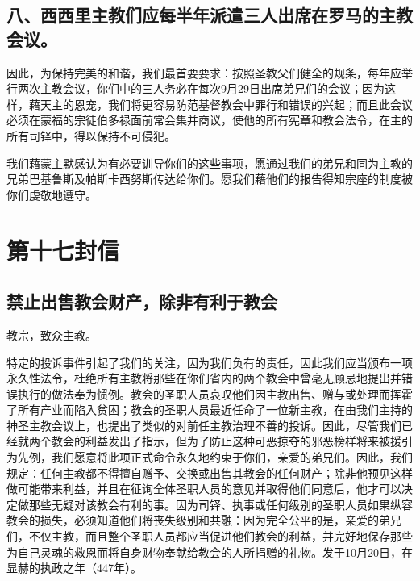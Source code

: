 
\subsection{八、西西里主教们应每半年派遣三人出席在罗马的主教会议。}

因此，为保持完美的和谐，我们最首要要求：按照圣教父们健全的规条，每年应举行两次主教会议，你们中的三人务必在每次9月29日出席弟兄们的会议；因为这样，藉天主的恩宠，我们将更容易防范基督教会中罪行和错误的兴起；而且此会议必须在蒙福的宗徒伯多禄面前常会集并商议，使他的所有宪章和教会法令，在主的所有司铎中，得以保持不可侵犯。\par

我们藉蒙主默感认为有必要训导你们的这些事项，愿通过我们的弟兄和同为主教的兄弟巴基鲁斯及帕斯卡西努斯传达给你们。愿我们藉他们的报告得知宗座的制度被你们虔敬地遵守。\par



\section{第十七封信}


\subsection{禁止出售教会财产，除非有利于教会}

教宗，致众主教。\par

特定的投诉事件引起了我们的关注，因为我们负有的责任，因此我们应当颁布一项永久性法令，杜绝所有主教将那些在你们省内的两个教会中曾毫无顾忌地提出并错误执行的做法奉为惯例。教会的圣职人员哀叹他们因主教出售、赠与或处理而挥霍了所有产业而陷入贫困；教会的圣职人员最近任命了一位新主教，在由我们主持的神圣主教会议上，也提出了类似的对前任主教治理不善的投诉。因此，尽管我们已经就两个教会的利益发出了指示，但为了防止这种可恶掠夺的邪恶榜样将来被援引为先例，我们愿意将此项正式命令永久地约束于你们，亲爱的弟兄们。因此，我们规定：任何主教都不得擅自赠予、交换或出售其教会的任何财产；除非他预见这样做可能带来利益，并且在征询全体圣职人员的意见并取得他们同意后，他才可以决定做那些无疑对该教会有利的事。因为司铎、执事或任何级别的圣职人员如果纵容教会的损失，必须知道他们将丧失级别和共融：因为完全公平的是，亲爱的弟兄们，不仅主教，而且整个圣职人员都应当促进他们教会的利益，并完好地保存那些为自己灵魂的救恩而将自身财物奉献给教会的人所捐赠的礼物。发于10月20日，在显赫的执政之年（447年）。\par

